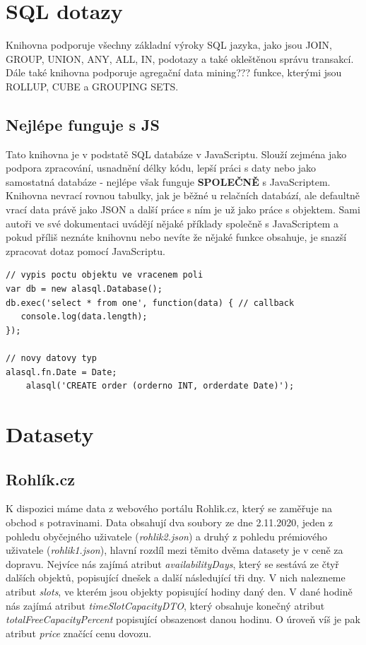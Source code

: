 \documentclass[a4, titlepage]{article}
\begin{document}
\section{SQL dotazy}
Knihovna podporuje všechny základní výroky SQL jazyka, jako jsou JOIN, GROUP, UNION, ANY, ALL, IN, podotazy a také okleštěnou správu transakcí. Dále také knihovna podporuje agregační data mining??? funkce, kterými jsou ROLLUP, CUBE a GROUPING SETS.

\subsection{Nejlépe funguje s JS}
Tato knihovna je v podstatě SQL databáze v JavaScriptu. Slouží zejména jako podpora zpracování, usnadnění délky kódu, lepší práci s daty nebo jako samostatná databáze - nejlépe však funguje \textbf{SPOLEČNĚ} s JavaScriptem. Knihovna nevrací rovnou tabulky, jak je běžné u relačních databází, ale defaultně vrací data právě jako JSON a další práce s ním je už jako práce s objektem. Sami autoři ve své dokumentaci uvádějí nějaké příklady společně s JavaScriptem a pokud příliš neznáte knihovnu nebo nevíte že nějaké funkce obsahuje, je snazší zpracovat dotaz pomocí JavaScriptu.

\begin{lstlisting}
// vypis poctu objektu ve vracenem poli
var db = new alasql.Database();
db.exec('select * from one', function(data) { // callback
   console.log(data.length);						
});

// novy datovy typ
alasql.fn.Date = Date;
    alasql('CREATE order (orderno INT, orderdate Date)');
\end{lstlisting}

\section{Datasety}
\subsection{Rohlík.cz}
K dispozici máme data z webového portálu Rohlik.cz, který se zaměřuje na obchod s potravinami. Data obsahují dva soubory ze dne 2.11.2020, jeden z pohledu obyčejného uživatele (\textit{rohlik2.json}) a druhý z pohledu prémiového uživatele (\textit{rohlik1.json}), hlavní rozdíl mezi těmito dvěma datasety je v ceně za dopravu. Nejvíce nás zajímá atribut \textit{availabilityDays}, který se sestává ze čtyř dalších objektů, popisující dnešek a další následující tři dny. V nich nalezneme atribut \textit{slots}, ve kterém jsou objekty popisující hodiny daný den. V dané hodině nás zajímá atribut \textit{timeSlotCapacityDTO}, který obsahuje konečný atribut \textit{totalFreeCapacityPercent} popisující obsazenost danou hodinu. O úroveň víš je pak atribut \textit{price} značící cenu dovozu.
\end{document}
